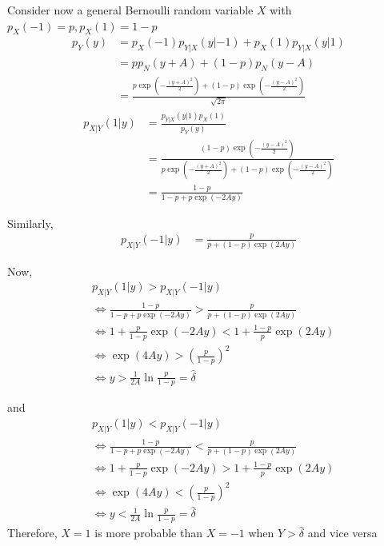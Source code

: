 \documentclass[journal,12pt,twocolumn]{IEEEtran}
\providecommand{\brak}[1]{\ensuremath{\left(#1\right)}}
\numberwithin{equation}{section}
\renewcommand\thesection{\arabic{section}}
\begin{document}
\begin{enumerate}[label=\thesection.\arabic*,ref=\thesection.\theenumi]
	Consider now a general Bernoulli random variable $X$ with $p_X(-1) = p, p_X(1) = 1-p$
	\begin{align}
		p_Y(y) &= p_X(-1) p_{Y|X}(y|-1) + p_X(1) p_{Y|X}(y|1) \\
		&= p p_N(y+A) + (1-p) p_N(y-A) \\
		&= \frac{p\exp\brak{-\frac{(y+A)^2}{2}} + (1-p)\exp\brak{-\frac{(y-A)^2}{2}}}{\sqrt{2\pi}}
	\end{align}
	\begin{align}
		p_{X|Y}(1|y) &= \frac{p_{Y|X}(y|1) p_X(1)}{p_Y(y)} \\
		&= \frac{(1-p)\exp\brak{-\frac{(y-A)^2}{2}}}{p\exp\brak{-\frac{(y+A)^2}{2}} + (1-p)\exp\brak{-\frac{(y-A)^2}{2}}} \\
		&= \frac{1-p}{1-p + p\exp(-2Ay)}
	\end{align}
	
	Similarly,
	\begin{align}
		p_{X|Y}(-1|y) &= \frac{p}{p + (1-p)\exp(2Ay)}
	\end{align}
	
	Now,
	\begin{align}
		&p_{X|Y}(1|y) > p_{X|Y}(-1|y) \\
		&\iff \frac{1-p}{1-p + p\exp(-2Ay)} > \frac{p}{p + (1-p)\exp(2Ay)} \\
		&\iff 1 + \frac{p}{1-p}\exp(-2Ay) < 1 + \frac{1-p}{p}\exp(2Ay) \\
		&\iff \exp(4Ay) > \brak{\frac{p}{1-p}}^2 \\
		&\iff y > \frac{1}{2A} \ln\frac{p}{1-p} = \hat{\delta}
	\end{align}
	
	and
	\begin{align}
		&p_{X|Y}(1|y) < p_{X|Y}(-1|y) \\
		&\iff \frac{1-p}{1-p + p\exp(-2Ay)} < \frac{p}{p + (1-p)\exp(2Ay)} \\
		&\iff 1 + \frac{p}{1-p}\exp(-2Ay) > 1 + \frac{1-p}{p}\exp(2Ay) \\
		&\iff \exp(4Ay) < \brak{\frac{p}{1-p}}^2 \\
		&\iff y < \frac{1}{2A} \ln\frac{p}{1-p} = \hat{\delta}
	\end{align}
	Therefore, $X=1$ is more probable than $X=-1$ when $Y>\hat{\delta}$ and vice versa
	\end{enumerate}
	
\end{document}
